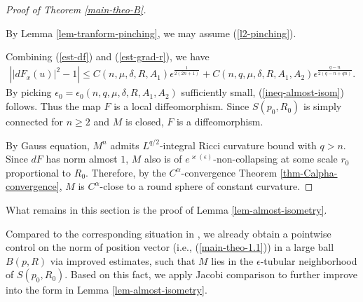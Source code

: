 \documentclass{amsart}
\numberwithin{equation}{section}
\theoremstyle{remark}
\renewcommand{\(}{\left(}
\renewcommand{\)}{\right)}
\renewcommand{\~}{\tilde}
\renewcommand{\-}{\overline}
\renewcommand{\d}{\delta}
\newcommand{\e}{\epsilon}
\begin{document}
\vspace{2mm}
\begin{proof}[Proof of Theorem \ref{main-theo-B}]
	~
	
	By Lemma \ref{lem-tranform-pinching}, we may assume (\ref{l2-pinching}).
	
	Combining (\ref{est-df}) and (\ref{est-grad-r}), we have
	\begin{align*}
	\left| |dF_x(u)|^2-1 \right| \leq C(n,\mu,\d,R,A_1)\e^\frac{1}{2(2n+1)}+C(n,q,\mu,\d,R,A_1,A_2)\e^\frac{q-n}{2(q-n+qn)}.
	\end{align*}
	By picking $\e_0=\e_0(n,q,\mu,\d,R,A_1,A_2)$ sufficiently small,  (\ref{ineq-almost-isom}) follows. Thus the map $F$ is a local diffeomorphism. Since $S(p_0,R_0)$ is simply connected for $n\geq 2$ and $M$ is closed, $F$ is a diffeomorphism.
	
	By Gauss equation, $M^n$ admits $L^{q/2}$-integral Ricci curvature bound with $q>n$. Since $dF$ has norm almost $1$, $M$ also is of $e^{\varkappa(\e)}$-non-collapsing at some scale  $r_0$ proportional to $R_0$. Therefore, by the $C^{\alpha}$-convergence Theorem \ref{thm-Calpha-convergence}, $M$ is $C^{\alpha}$-close to a round sphere of constant curvature.
	
\end{proof}




What remains in this section is the proof of Lemma \ref{lem-almost-isometry}.

Compared to the corresponding situation in \cite{Grosjean-Roth2012}, we already obtain
a pointwise control on the norm of position vector (i.e., (\ref{main-theo-1.1})) in a large ball $B(p,R)$ via improved estimates, such that $M$ lies in the $\e$-tubular neighborhood of $S(p_0,R_0)$. Based on this fact, we apply Jacobi comparison to further improve \cite[Lemma 4.2]{Grosjean-Roth2012} into the form in Lemma \ref{lem-almost-isometry}.
\end{document}
